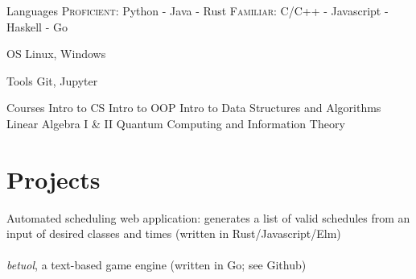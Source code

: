 \documentclass{tccv}
\begin{document}
\begin{factlist}

\item{Languages}
    {{\textsc{Proficient:}} Python - Java - Rust \newline
     {\textsc{Familiar:}} C/C++ - Javascript - Haskell - Go}
    
\item{OS}
    {Linux, Windows}

\item{Tools}
    {Git, Jupyter}

\item{Courses}
    {Intro to CS \newline
    Intro to OOP \newline
    Intro to Data Structures and Algorithms \newline
    Linear Algebra I \& II \newline
    Quantum Computing and Information Theory}


\end{factlist}

\vspace{-24pt}

\section{Projects}

Automated scheduling web application: generates a list of valid schedules from an input of desired classes and times (written in Rust/Javascript/Elm) \\\\
\emph{betuol}, a text-based game engine (written in Go; see Github)
\end{document}
